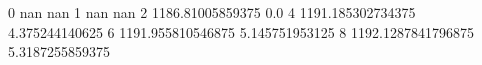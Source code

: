 0 nan nan
1 nan nan
2 1186.81005859375 0.0
4 1191.185302734375 4.375244140625
6 1191.955810546875 5.145751953125
8 1192.1287841796875 5.3187255859375
